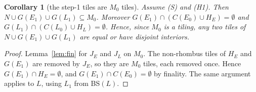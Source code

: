 \documentclass[11pt]{article}
\newtheorem{corollary}[theorem]{Corollary}
\theoremstyle{definition}\newtheorem{definition}[theorem]{Definition}\newtheorem{remark}[theorem]{Remark}
\begin{document}
\begin{corollary}[the step-1 tiles are $M_0$ tiles]\label{cor:m0}
Assume (S) and (H1). Then $N\cup G(E_1)\cup G(L_1)\subseteq M_0$. Moreover $G(E_1)\cap(C(E_0)\cup H_E)=\emptyset$ and $G(L_1)\cap(C(L_0)\cup H_L)=\emptyset$. Hence, since $M_0$ is a tiling, any two tiles of $N\cup G(E_1)\cup G(L_1)$ are equal or have disjoint interiors.
\end{corollary}
\begin{proof}
Lemma~\ref{lem:fin} for $J_E$ and $J_L$ on $M_0$. The non-rhombus tiles of $H_E$ and $G(E_1)$ are removed by $J_E$, so they are $M_0$ tiles, each removed once. Hence $G(E_1)\cap H_E=\emptyset$, and $G(E_1)\cap C(E_0)=\emptyset$ by finality. The same argument applies to $L$, using $L_1$ from BS$(L)$.
\end{proof}
\end{document}
